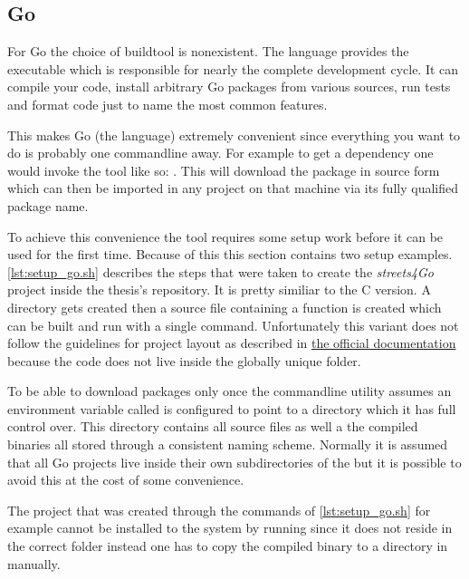 \subsection{Go}
\label{subsec:Implementation::Setup::Go}

For Go the choice of buildtool is nonexistent. The language provides the  executable which is responsible for nearly the complete development cycle. It can compile your code, install arbitrary Go packages from various sources, run tests and format code just to name the most common features.

This makes Go (the language) extremely convenient since everything you want to do is probably one commandline away. For example to get a dependency one would invoke the tool like so: . This will download the package in source form which can then be imported in any project on that machine via its fully qualified package name.

To achieve this convenience the  tool requires some setup work before it can be used for the first time. Because of this this section contains two setup examples.
\\


\autoref{lst:setup_go.sh} describes the steps that were taken to create the \textit{streets4Go} project inside the thesis's repository. It is pretty similiar to the C version. A directory gets created then a source file containing a  function is created which can be built and run with a single command. Unfortunately this variant does not follow the guidelines for project layout as described in \href{https://golang.org/doc/code.html#Workspaces}{the official documentation} because the code does not live inside the globally unique  folder.

To be able to download packages only once the  commandline utility assumes an environment variable called  is configured to point to a directory which it has full control over. This directory contains all source files as well a the compiled binaries all stored through a consistent naming scheme. Normally it is assumed that all Go projects live inside their own subdirectories of the  but it is possible to avoid this at the cost of some convenience.

The project that was created through the commands of \autoref{lst:setup_go.sh} for example cannot be installed to the system by running  since it does not reside in the correct folder instead one has to copy the compiled binary to a directory in  manually.

